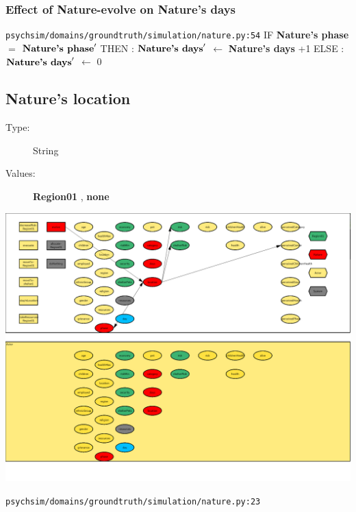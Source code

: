 \documentclass{article}%
\begin{document}
\subsubsection{Effect of Nature{-}evolve on Nature's days}%
\label{ssubsec:Effect of Nature{-}evolve on Nature's days}%
\begin{flushleft}%
\verb|psychsim/domains/groundtruth/simulation/nature.py:54|%
\linebreak%
IF %
\textbf{Nature's phase}%
$=$%
$\mbox{\textbf{Nature's phase}} '$%
\linebreak%
\hspace*{2em}%
THEN %
: %
$\mbox{\textbf{Nature's days}} '$%
$\leftarrow$%
\textbf{Nature's days}%
+1%
\linebreak%
\hspace*{2em}%
ELSE %
: %
$\mbox{\textbf{Nature's days}} '$%
$\leftarrow$%
0%
\end{flushleft}

%
\subsection{Nature's location}%
\label{subsec:Nature's location}%
\begin{description}%
\item[Type:]%
String%
\item[Values:]%
\textbf{Region01}%
, %
\textbf{none}%
\end{description}%
\includegraphics[width=\textwidth]{images/locationOfNature.png}%
\begin{flushleft}%
\verb|psychsim/domains/groundtruth/simulation/nature.py:23|%
\end{flushleft}%
\end{document}
